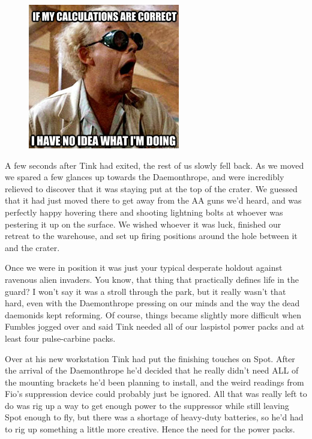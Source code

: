 \begin{figure}
	\begin{center}
		\includegraphics[width=\figwidth]{pics/16/41.png}
	\end{center}
\end{figure}
A few seconds after Tink had exited, the rest of us slowly fell back. 
As we moved we spared a few glances up towards the Daemonthrope, and were incredibly relieved to discover that it was staying put at the top of the crater. 
We guessed that it had just moved there to get away from the AA guns we'd heard, and was perfectly happy hovering there and shooting lightning bolts at whoever was pestering it up on the surface. 
We wished whoever it was luck, finished our retreat to the warehouse, and set up firing positions around the hole between it and the crater.

Once we were in position it was just your typical desperate holdout against ravenous alien invaders. 
You know, that thing that practically defines life in the guard? 
I won't say it was a stroll through the park, but it really wasn't that hard, even with the Daemonthrope pressing on our minds and the way the dead daemonids kept reforming. 
Of course, things became slightly more difficult when Fumbles jogged over and said Tink needed all of our laspistol power packs and at least four pulse-carbine packs.

Over at his new workstation Tink had put the finishing touches on Spot. 
After the arrival of the Daemonthrope he'd decided that he really didn't need ALL of the mounting brackets he'd been planning to install, and the weird readings from Fio's suppression device could probably just be ignored. 
All that was really left to do was rig up a way to get enough power to the suppressor while still leaving Spot enough to fly, but there was a shortage of heavy-duty batteries, so he'd had to rig up something a little more creative. 
Hence the need for the power packs.

